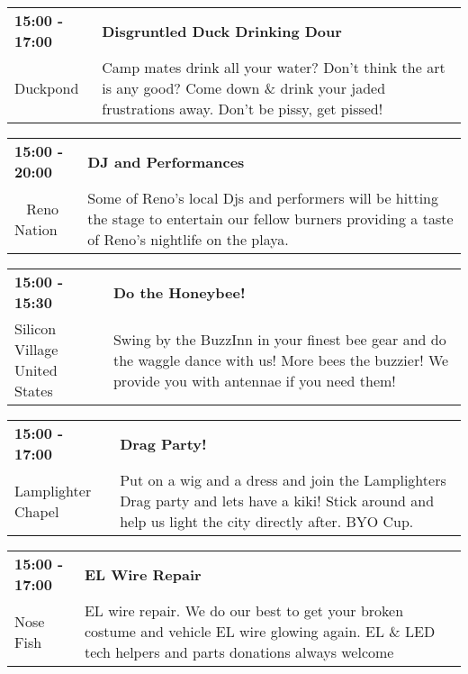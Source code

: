 \begin{tabular}{ p{1in} p{2.2in} }
    \textbf{15:00 - 17:00} & \textbf{Disgruntled Duck Drinking Dour} \\
    Duckpond \newline  & Camp mates drink all your water? Don't think the art is any good? Come down \& drink your jaded frustrations away. Don't be pissy, get pissed! \\
    \hline 
\end{tabular}
    
\begin{tabular}{ p{1in} p{2.2in} }
    \textbf{15:00 - 20:00} & \textbf{DJ and Performances} \\
    ~ \newline Reno Nation & Some of Reno's local Djs and performers will be hitting the stage to entertain our fellow burners providing a taste of Reno's nightlife on the playa. \\
    \hline 
\end{tabular}
    
\begin{tabular}{ p{1in} p{2.2in} }
    \textbf{15:00 - 15:30} & \textbf{Do the Honeybee!} \\
    Silicon Village \newline United States & Swing by the BuzzInn in your finest bee gear and do the waggle dance with us!  More bees the buzzier! We provide you with antennae if you need them! \\
    \hline 
\end{tabular}
    
\begin{tabular}{ p{1in} p{2.2in} }
    \textbf{15:00 - 17:00} & \textbf{Drag Party!} \\
    Lamplighter Chapel \newline  & Put on a wig and a dress and join the Lamplighters Drag party and lets have a kiki! Stick around and help us light the city directly after. BYO Cup. \\
    \hline 
\end{tabular}
    
\begin{tabular}{ p{1in} p{2.2in} }
    \textbf{15:00 - 17:00} & \textbf{EL Wire Repair} \\
    Nose Fish \newline  & EL wire repair. We do our best to get your broken costume and vehicle EL wire glowing again. EL \& LED tech helpers and parts donations always welcome \\
    \hline 
\end{tabular}
    
